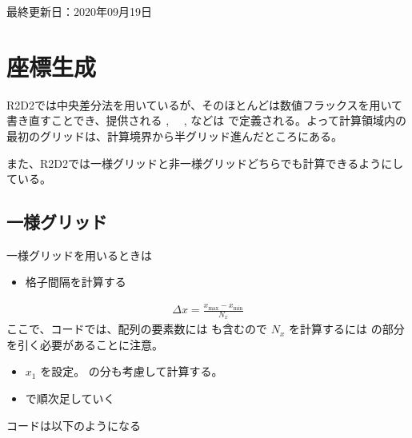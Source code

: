 \documentclass[letterpaper,10pt,dvipdfmx,report]{sphinxmanual}
\begin{document}
最終更新日：2020年09月19日


\chapter{座標生成}
\label{\detokenize{geometry:id1}}\label{\detokenize{geometry::doc}}
R2D2では中央差分法を用いているが、そのほとんどは数値フラックスを用いて書き直すことでき、提供される  , 　,  などは  で定義される。よって計算領域内の最初のグリッドは、計算境界から半グリッド進んだところにある。

また、R2D2では一様グリッドと非一様グリッドどちらでも計算できるようにしている。


\section{一様グリッド}
\label{\detokenize{geometry:id2}}
一様グリッドを用いるときは
\begin{itemize}
\item {} 
格子間隔を計算する

\end{itemize}
\begin{equation*}
\begin{split}\Delta x = \frac{x_\mathrm{max} - x_\mathrm{min}}{N_x}\end{split}
\end{equation*}
ここで、コードでは、配列の要素数には  も含むので
\(N_x\) を計算するには  の部分を引く必要があることに注意。
\begin{itemize}
\item {} 
\(x_1\) を設定。 の分も考慮して計算する。

\item {} 
 で順次足していく

\end{itemize}

コードは以下のようになる

\begin{sphinxVerbatim}[commandchars=\\\{\}]
  
    
   
  
            
\end{sphinxVerbatim}
\end{document}
